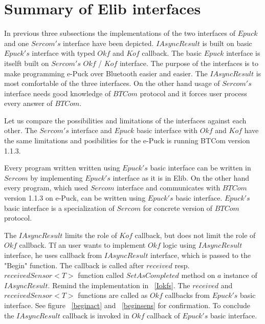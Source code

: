 \section{Summary of Elib interfaces}
\label{sec:suminterface}
	In previous three subsections the implementations of the two interfaces of $Epuck$ 
	and one $Sercom's$ interface have been depicted.
	$IAsyncResult$ is built on basic $Epuck's$ interface with typed $Okf$ and $Kof$ callback. 
	The basic $Epuck$ interface is itselft built on $Sercom's$ $Okf$ / $Kof$ interface.
	The purpose of the interfaces is to make programming e-Puck over Bluetooth easier and easier.
	The $IAsyncResult$ is most comfortable of the three interfaces. On the other hand usage of $Sercom's$ interface
	needs good knowledge of $BTCom$ protocol and it forces user process every answer of $BTCom$.

	Let us compare the possibilities and limitations of the interfaces against each other.
	The $Sercom's$ interface and $Epuck$ basic interface with $Okf$ and $Kof$ 
	have the same limitations and posibilities for the e-Puck is running BTCom version 1.1.3. 
	
	Every program written written using $Epuck's$ basic interface can be written
	in $Sercom$ by implementing $Epuck's$ interface as it is in Elib.
	On the other hand every program, which used $Sercom$ interface and communicates with $BTCom$
	version 1.1.3 on e-Puck, can be written using $Epuck's$ basic interface. 
	$Epuck's$ basic interface is a specialization of $Sercom$ for concrete version of $BTCom$
	protocol.

	The $IAsyncResult$ limits the role of $Kof$ callback, but does not limit the role of $Okf$ callback.
	Tf an user wants to implement $Okf$ logic using $IAsyncResult$ interface, he uses callback from $IAsyncResult$
	interface, which is passed to the "Begin" function.
	The callback is called after $received$ resp. $receivedSensor<T>$ function called $SetAsCompleted$ method
	on $a$ instance of $IAsyncResult$. Remind the implementation in ~\ref{Iokfs}.
	The $received$ and $receivedSensor<T>$ functions are called as $Okf$ callbacks from $Epuck's$ basic interface.
	See figure ~\ref{beginact} and ~\ref{beginsens} for confirmation.
	To conclude the $IAsyncResult$ callback is invoked in $Okf$ callback of $Epuck's$ basic interface.

